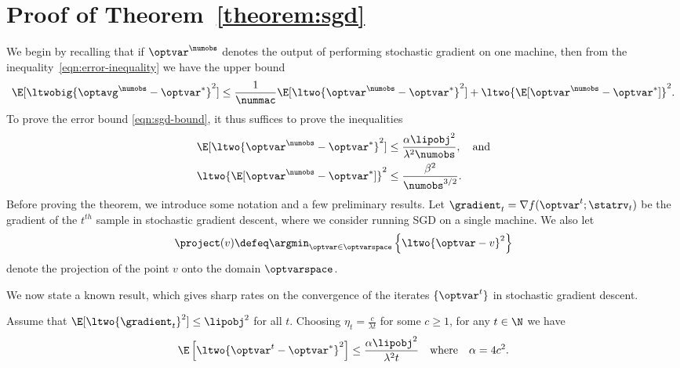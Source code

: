 \documentclass[11pt,twoside]{article}
\theoremstyle{definition}
\begin{document}
\section{Proof of Theorem~\ref{theorem:sgd}}
\label{sec:proof-sgd}

We begin by recalling that if $\optvar^\numobs$ denotes the output
of performing stochastic gradient on one machine, then
from the inequality~\eqref{eqn:error-inequality} we have the upper bound
\begin{equation*}
  \E[\ltwobig{\optavg^\numobs -\optvar^*}^2]
  \leq \frac{1}{\nummac}
  \E[\ltwo{\optvar^\numobs - \optvar^*}^2] +
  \ltwo{\E[\optvar^\numobs - \optvar^*]}^2.
\end{equation*}
To prove the error bound \eqref{eqn:sgd-bound}, it thus suffices to
prove the inequalities
\begin{subequations}
  \begin{align}
    \E[\ltwo{\optvar^\numobs - \optvar^*}^2]
    & \le \frac{\alpha \lipobj^2}{\lambda^2 \numobs},
    ~~~\mbox{and}
    \label{eqn:sgd-bound-part1} \\
    \ltwo{\E[\optvar^\numobs - \optvar^*]}^2
    &\leq \frac{\beta^2}{\numobs^{3/2}}.
    \label{eqn:sgd-bound-part2}
  \end{align}
\end{subequations}
 Before proving the theorem, we introduce some notation and a few
 preliminary results.  Let $\gradient_t = \nabla f(\optvar^t;
 \statrv_t)$ be the gradient of the $t^{th}$ sample in stochastic
 gradient descent, where we consider running SGD on a single
 machine. We also let
\begin{equation*}
  \project(v) \defeq \argmin_{\optvar \in \optvarspace}
  \left\{ \ltwo{\optvar - v}^2 \right\}
\end{equation*}
denote the projection of the point $v$ onto the domain $\optvarspace$.

We now state a known result, which gives sharp rates on the
convergence of the iterates $\{\optvar^t\}$ in stochastic gradient
descent.
\begin{lemma}
  \label{lemma:sgd-distance-bound}
  Assume that $\E[\ltwo{\gradient_t}^2] \leq \lipobj^2$ for all $t$. Choosing
  $\eta_t=\frac{c}{\lambda t}$ for some $c\geq 1$, for any $t \in \N$ we have
  \begin{equation*}
    \E\left[\ltwo{\optvar^t-\optvar^*}^2\right]
    \leq \frac{\alpha \lipobj^2}{\lambda^2t}
    ~~~ \mbox{where} ~~~
    \alpha = 4c^2.
  \end{equation*}
\end{lemma}
\end{document}
